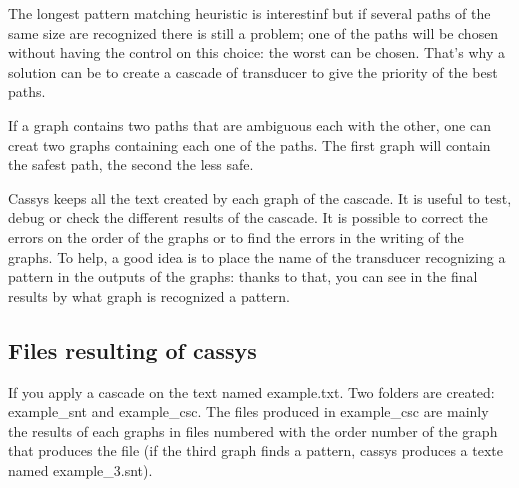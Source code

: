 \bigskip
\noindent The longest pattern matching heuristic is interestinf but if several paths of the same size are recognized there is still a problem; one of the paths will be chosen without having the control on this choice: the worst can be chosen.
That's why a solution can be to create a cascade of transducer to give the priority of the best paths.

\bigskip
\noindent If a graph contains two paths that are ambiguous each with the other, one can creat two graphs containing each one of the paths. 
The first graph will contain the safest path, the second the less safe.

\bigskip
\noindent Cassys keeps all the text created by each graph of the cascade. It is useful to test, debug or check the different results of the cascade. It is possible 
to correct the errors on the order of the graphs or to find the errors in the writing of the graphs. To help, a good idea is to place the name of the transducer recognizing a pattern in the outputs of the graphs: thanks to that, you can see in the final results by what graph is recognized a pattern. 

\subsection{Files resulting of cassys}

If you apply a cascade on the text named example.txt.
Two folders are created: example\_snt and example\_csc.
The files produced in example\_csc are mainly the results of each graphs in files numbered with the order number of the graph that produces the file (if the third graph
finds a pattern, cassys produces a texte named example\_3.snt).


